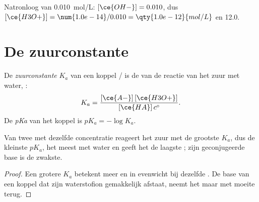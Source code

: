 \begin{example}[Natronloog]\label{ex:g12:ka-and-pka:naoh}
Natronloog van \qty{0.010}{mol/L}: $[\ce{OH-}] = 0.010$, dus
$[\ce{H3O+}] = \num{1.0e-14}/0.010 = \qty{1.0e-12}{mol/L}$ en  12.0.
\end{example}

\section{De zuurconstante}

\begin{definition}[Zuurconstante, $pK_a$]\label{def:g12:ka-and-pka:ka}
De \emph{zuurconstante} $K_a$ van een koppel
/ is de  van de reactie van het zuur met
water, :
\[
  K_a = \frac{[\ce{A-}]\,[\ce{H3O+}]}{[\ce{HA}]\,c^\circ} .
\]
De \emph{pKa} van het koppel is
$pK_a = -\log K_a$.
\end{definition}

\begin{proposition}\label{prop:g12:ka-and-pka:compare}
Van twee  met dezelfde concentratie reageert het zuur met de
grootste $K_a$, dus de kleinste $pK_a$, het meest met water en geeft het
de laagste ; zijn geconjugeerde base is de zwakste.
\end{proposition}

\begin{proof}
Een grotere $K_a$ betekent meer  en  in evenwicht bij
dezelfde . De base  van een koppel dat zijn waterstofion
gemakkelijk afstaat, neemt het maar met moeite terug.
\end{proof}

